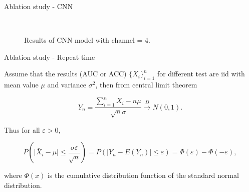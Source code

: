 \documentclass{beamer}
\begin{document}
\begin{frame}{Ablation study - CNN}

    \begin{figure}[H]
         \\
        \caption{Results of CNN model with channel = 4.}
    \end{figure}

\end{frame}

\begin{frame}{Ablation study - Repeat time}

    Assume that the results (AUC or ACC) $\{X_i\}_{i=1}^n$ for different test are iid with mean value $\mu$ and variance $\sigma^2$, then from central limit theorem

    $$
        Y_n = \frac{\sum_{i=1}^n X_i - n \mu}{\sqrt{n} \sigma} \xrightarrow{D} N(0, 1).
    $$

    Thus for all $\varepsilon > 0$,

    $$
        P\left(\vert \bar{X}_i - \mu \vert \leq \frac{\sigma \varepsilon}{\sqrt{n}}\right) = P(\vert Y_n - E(Y_n) \vert \leq \varepsilon) = \varPhi(\varepsilon) - \varPhi(-\varepsilon),
    $$

    where $\varPhi(x)$ is the cumulative distribution function of the standard normal distribution.

\end{frame}
\end{document}
